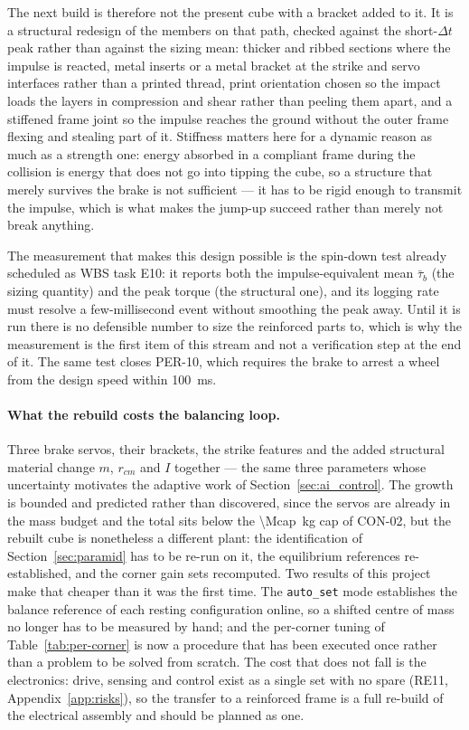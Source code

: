 The next build is therefore not the present cube with a bracket added to it. It
is a structural redesign of the members on that path, checked against the
short-$\Delta t$ peak rather than against the sizing mean: thicker and ribbed
sections where the impulse is reacted, metal inserts or a metal bracket at the
strike and servo interfaces rather than a printed thread, print orientation
chosen so the impact loads the layers in compression and shear rather than
peeling them apart, and a stiffened frame joint so the impulse reaches the
ground without the outer frame flexing and stealing part of it. Stiffness
matters here for a dynamic reason as much as a strength one: energy absorbed in
a compliant frame during the collision is energy that does not go into tipping
the cube, so a structure that merely survives the brake is not sufficient --- it
has to be rigid enough to transmit the impulse, which is what makes the jump-up
succeed rather than merely not break anything.

The measurement that makes this design possible is the spin-down test already
scheduled as WBS task E10: it reports both the impulse-equivalent mean
$\bar\tau_b$ (the sizing quantity) and the peak torque (the structural one), and
its logging rate must resolve a few-millisecond event without smoothing the peak
away. Until it is run there is no defensible number to size the reinforced parts
to, which is why the measurement is the first item of this stream and not a
verification step at the end of it. The same test closes PER-10, which requires
the brake to arrest a wheel from the design speed within \qty{100}{\milli\second}.

\paragraph{What the rebuild costs the balancing loop.} Three brake servos, their
brackets, the strike features and the added structural material change $m$,
$r_{cm}$ and $I$ together --- the same three parameters whose uncertainty
motivates the adaptive work of Section~\ref{sec:ai_control}. The growth is
bounded and predicted rather than discovered, since the servos are already in
the mass budget and the total sits below the \qty{\Mcap}{\kilo\gram} cap of
CON-02, but the rebuilt cube is nonetheless a different plant: the
identification of Section~\ref{sec:paramid} has to be re-run on it, the
equilibrium references re-established, and the corner gain sets recomputed. Two
results of this project make that cheaper than it was the first time. The
\texttt{auto\_set} mode establishes the balance reference of each resting
configuration online, so a shifted centre of mass no longer has to be measured
by hand; and the per-corner tuning of Table~\ref{tab:per-corner} is now a
procedure that has been executed once rather than a problem to be solved from
scratch. The cost that does not fall is the electronics: drive, sensing and
control exist as a single set with no spare (RE11, Appendix~\ref{app:risks}), so
the transfer to a reinforced frame is a full re-build of the electrical
assembly and should be planned as one.

